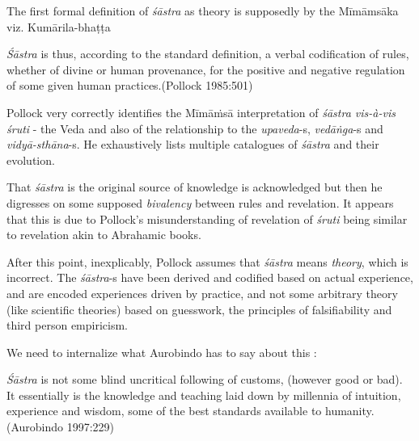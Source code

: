The first formal definition of {\sl śāstra} as theory is supposedly by the Mīmāmsāka viz. Kumārila-bhaṭṭa

\newpage

\begin{myquote}
{{\sl Śāstra}} is thus, according to the standard definition, a verbal codification of rules, whether of divine or human provenance, for the positive and negative regulation of some given human practices.\hfill (Pollock 1985:501)
\end{myquote}

Pollock very correctly identifies the Mīmāṁsā interpretation of {\sl śāstra vis-à-vis śruti} - the Veda and also of the relationship to the {\sl upaveda}-s, {\sl vedāṅga}-s and  {\sl vidyā-sthāna}-s. He exhaustively lists multiple catalogues of {\sl śāstra} and their evolution.

That {\sl śāstra} is the original source of knowledge is acknowledged but then he digresses on some supposed {\sl bivalency} between rules and revelation. It appears that this is due to Pollock's misunderstanding of revelation of {\sl śruti} being similar to revelation akin to Abrahamic books.

After this point, inexplicably, Pollock assumes that {\sl śāstra} means {\sl theory}, which is incorrect. The {\sl śāstra}-s have been derived and codified based on actual experience, and are encoded experiences driven by practice, and not some arbitrary theory (like scientific theories) based on guesswork, the principles of falsifiability and third person empiricism.

We need to internalize what Aurobindo has to say about this :
\begin{myquote}
{{\sl Śāstra}} is not some blind uncritical following of customs, (however good or bad). It essentially is the knowledge and teaching laid down by millennia of intuition, experience and wisdom, some of the best standards available to humanity.\hfill (Aurobindo 1997:229)
\end{myquote}

